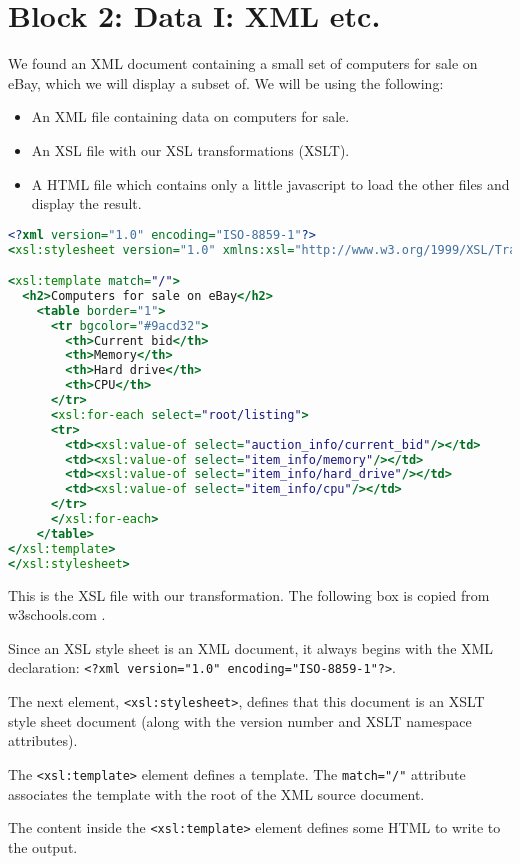 \section{Block 2: Data I: XML etc.}

We found an XML document containing a small set of computers for sale on eBay, which we will display a subset of. We will be using the following:
\begin{itemize}
\item An XML file containing data on computers for sale.
\item An XSL file with our XSL transformations (XSLT).
\item A HTML file which contains only a little javascript to load the other files and display the result.
\end{itemize}

\begin{lstlisting}[language=xslt,label=lst:xslt] 
<?xml version="1.0" encoding="ISO-8859-1"?>
<xsl:stylesheet version="1.0" xmlns:xsl="http://www.w3.org/1999/XSL/Transform">

<xsl:template match="/">
  <h2>Computers for sale on eBay</h2>
    <table border="1">
      <tr bgcolor="#9acd32">
        <th>Current bid</th>
        <th>Memory</th>
        <th>Hard drive</th>
        <th>CPU</th>
      </tr>
      <xsl:for-each select="root/listing">
      <tr>
        <td><xsl:value-of select="auction_info/current_bid"/></td>
        <td><xsl:value-of select="item_info/memory"/></td>
        <td><xsl:value-of select="item_info/hard_drive"/></td>
        <td><xsl:value-of select="item_info/cpu"/></td>
      </tr>
      </xsl:for-each>
    </table>
</xsl:template>
</xsl:stylesheet>
\end{lstlisting}

This is the XSL file with our transformation. The following box is copied from w3schools.com \citep{w3xslt}.

\begin{framed}
Since an XSL style sheet is an XML document, it always begins with the XML declaration: \lstinline$<?xml version="1.0" encoding="ISO-8859-1"?>$.

The next element, \lstinline$<xsl:stylesheet>$, defines that this document is an XSLT style sheet document (along with the version number and XSLT namespace attributes).

The \lstinline$<xsl:template>$ element defines a template. The \lstinline$match="/"$ attribute associates the template with the root of the XML source document.

The content inside the \lstinline$<xsl:template>$ element defines some HTML to write to the output.
\end{framed}

